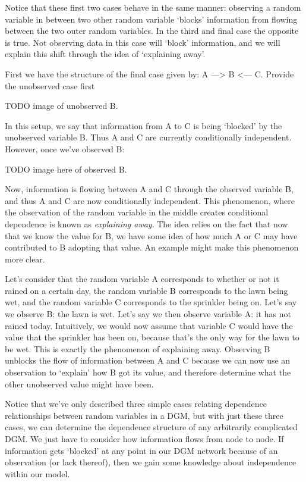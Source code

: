 Notice that these first two cases behave in the same manner: observing a random variable in between two other random variable `blocks' information from flowing between the two outer random variables. In the third and final case the opposite is true. Not observing data in this case will `block' information, and we will explain this shift through the idea of `explaining away'.

First we have the structure of the final case given by: A ---> B <--- C. Provide the unobserved case first

TODO image of unobserved B.

In this setup, we say that information from A to C is being `blocked' by the unobserved variable B. Thus A and C are currently conditionally independent. However, once we've observed B:

TODO image here of observed B.

Now, information is flowing between A and C through the observed variable B, and thus A and C are now conditionally independent. This phenomenon, where the observation of the random variable in the middle creates conditional dependence is known as \textit{explaining away}. The idea relies on the fact that now that we know the value for B, we have some idea of how much A or C may have contributed to B adopting that value. An example might make this phenomenon more clear.

Let's consider that the random variable A corresponds to whether or not it rained on a certain day, the random variable B corresponds to the lawn being wet, and the random variable C corresponds to the sprinkler being on. Let's say we observe B: the lawn is wet. Let's say we then observe variable A: it has not rained today. Intuitively, we would now assume that variable C would have the value that the sprinkler has been on, because that's the only way for the lawn to be wet. This is exactly the phenomenon of explaining away. Observing B unblocks the flow of information between A and C because we can now use an observation to `explain' how B got its value, and therefore determine what the other unobserved value might have been.

Notice that we've only described three simple cases relating dependence relationships between random variables in a DGM, but with just these three cases, we can determine the dependence structure of any arbitrarily complicated DGM. We just have to consider how information flows from node to node. If information gets `blocked' at any point in our DGM network because of an observation (or lack thereof), then we gain some knowledge about independence within our model.

